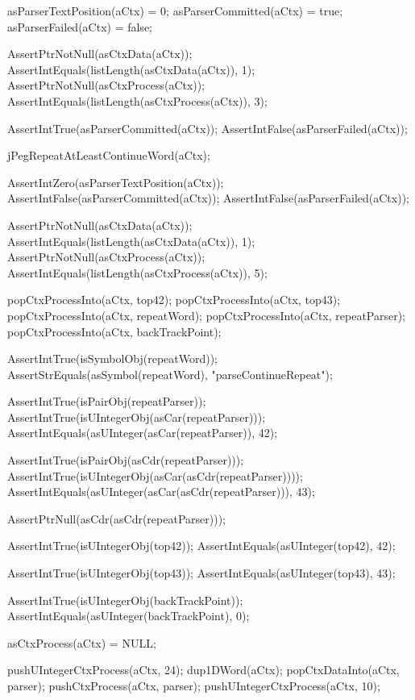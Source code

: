   asParserTextPosition(aCtx) = 0;
  asParserCommitted(aCtx)    = true;
  asParserFailed(aCtx)       = false;
  
  AssertPtrNotNull(asCtxData(aCtx));
  AssertIntEquals(listLength(asCtxData(aCtx)), 1);
  AssertPtrNotNull(asCtxProcess(aCtx));
  AssertIntEquals(listLength(asCtxProcess(aCtx)), 3);
  
  AssertIntTrue(asParserCommitted(aCtx));
  AssertIntFalse(asParserFailed(aCtx));
  
  jPegRepeatAtLeastContinueWord(aCtx);
  
  AssertIntZero(asParserTextPosition(aCtx));
  AssertIntFalse(asParserCommitted(aCtx));
  AssertIntFalse(asParserFailed(aCtx));
  
  AssertPtrNotNull(asCtxData(aCtx));
  AssertIntEquals(listLength(asCtxData(aCtx)), 1);
  AssertPtrNotNull(asCtxProcess(aCtx));
  AssertIntEquals(listLength(asCtxProcess(aCtx)), 5);
    
  popCtxProcessInto(aCtx, top42);
  popCtxProcessInto(aCtx, top43);
  popCtxProcessInto(aCtx, repeatWord);
  popCtxProcessInto(aCtx, repeatParser);
  popCtxProcessInto(aCtx, backTrackPoint);
  
  AssertIntTrue(isSymbolObj(repeatWord));
  AssertStrEquals(asSymbol(repeatWord), "parseContinueRepeat");
  
  AssertIntTrue(isPairObj(repeatParser));
  AssertIntTrue(isUIntegerObj(asCar(repeatParser)));
  AssertIntEquals(asUInteger(asCar(repeatParser)), 42);
  
  AssertIntTrue(isPairObj(asCdr(repeatParser)));
  AssertIntTrue(isUIntegerObj(asCar(asCdr(repeatParser))));
  AssertIntEquals(asUInteger(asCar(asCdr(repeatParser))), 43);
  
  AssertPtrNull(asCdr(asCdr(repeatParser)));
  
  AssertIntTrue(isUIntegerObj(top42));
  AssertIntEquals(asUInteger(top42), 42);  

  AssertIntTrue(isUIntegerObj(top43));
  AssertIntEquals(asUInteger(top43), 43);
  
  AssertIntTrue(isUIntegerObj(backTrackPoint));
  AssertIntEquals(asUInteger(backTrackPoint), 0);
\stopCTest
\stopTestCase

\startCTest
  asCtxProcess(aCtx) = NULL;
  
  pushUIntegerCtxProcess(aCtx, 24);
  dup1DWord(aCtx);
  popCtxDataInto(aCtx, parser);
  pushCtxProcess(aCtx, parser);
  pushUIntegerCtxProcess(aCtx, 10);
  
